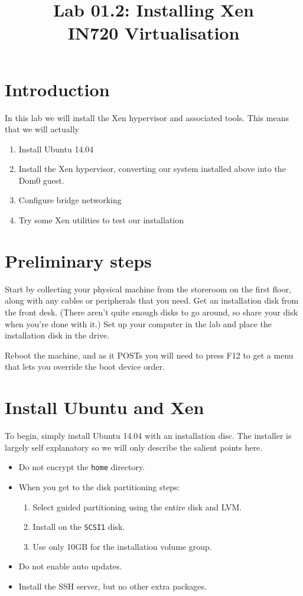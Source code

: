 \documentclass{article}
\begin{document}
\title{Lab 01.2: Installing Xen \\ IN720 Virtualisation}
\date{}
\maketitle

\section*{Introduction}
In this lab we will install the Xen hypervisor and associated tools. This means that we will actually

\begin{enumerate}
  \item Install Ubuntu 14.04 
  \item Install the Xen hypervisor, converting our system installed above into the Dom0 guest.
  \item Configure bridge networking 
  \item Try some Xen utilities to test our installation
\end{enumerate}

\section{Preliminary steps}
Start by collecting your physical machine from the storeroom on the first floor, along with any cables or peripherals that you need. Get an installation disk from the front desk. (There aren't quite enough disks to go around, so share your disk when you're done with it.) Set up your computer in the lab and place the installation disk in the drive.

Reboot the machine, and as it POSTs you will need to press F12 to get a menu that lets you override the boot device order.

\section{Install Ubuntu and Xen}
To begin, simply install Ubuntu 14.04 with an installation disc. The installer is largely self explanatory so we will only describe the salient points here.

\begin{itemize}
  \item Do not encrypt the \texttt{home} directory.
  \item When you get to the disk partitioning steps:
           \begin{enumerate}
             \item Select guided partitioning using the entire disk and LVM.
             \item Install on the \texttt{SCSI1} disk.
             \item Use only 10GB for the installation volume group.
           \end{enumerate}
   \item Do not enable auto updates.
   \item Install the SSH server, but no other extra packages.
 \end{itemize}
 
\end{document}
